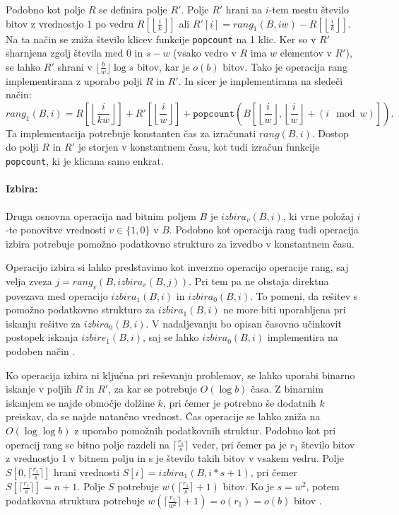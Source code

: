 Podobno kot polje $R$ se definira polje $R'$. Polje $R'$ hrani na $i$-tem mestu število bitov z vrednostjo $1$ po vedru $R[\left\lfloor\frac{i}{k} \right\rfloor]$ ali $R'[i]=rang_1(B,iw)-R[\left\lfloor\frac{i}{k} \right\rfloor]$. Na ta način se zniža število klicev funkcije \texttt{popcount} na 1 klic. Ker so v $R'$ sharnjena zgolj števila med 0 in $s-w$ (vsako vedro v $R$ ima $w$ elementov v $R'$), se lahko $R'$ shrani v $\lfloor\frac{b}{w}\rfloor\log{s}$ bitov, kar je $o(b)$ bitov. Tako je operacija rang implementirana z uporabo polji $R$ in $R'$. In sicer je implementirana na sledeči način:
\begin{equation*}
    rang_1(B,i)=R\left[\left\lfloor\frac{i}{kw} \right\rfloor\right]+ R'\left[\left\lfloor\frac{i}{w} \right\rfloor\right]+\texttt{popcount}\left(B\left[\left\lfloor\frac{i}{w} \right\rfloor,\left\lfloor\frac{i}{w} \right\rfloor+(i \mod w)\right]\right).
\end{equation*}
Ta implementacija potrebuje konstanten čas za izračunati $rang(B,i)$. Dostop do polji $R$ in $R'$ je storjen v konstantnem času, kot tudi izračun funkcije \texttt{popcount}, ki je klicana samo enkrat\cite{Navarro2016}.

\paragraph{Izbira:}
Druga osnovna operacija nad bitnim poljem $B$ je $izbira_v(B,i)$, ki vrne položaj $i$-te ponovitve vrednosti $v\in\{1,0\}$ v $B$. Podobno kot operacija rang tudi operacija izbira potrebuje pomožno podatkovno strukturo za izvedbo v konstantnem času. 

Operacijo izbira si lahko predstavimo kot inverzno operacijo operacije rang, saj velja zveza $j=rang_v(B,izbira_v(B,j))$. Pri tem pa ne obstaja direktna povezava med operacijo $izbira_1(B,i)$ in $izbira_0(B,i)$. To pomeni, da rešitev s pomožno podatkovno strukturo za $izbira_1(B,i)$ ne more biti uporabljena pri iskanju rešitve za $izbira_0(B,i)$. V nadaljevanju bo opisan časovno učinkovit postopek iskanja $izbire_1(B,i)$, saj se lahko $izbira_0(B,i)$ implementira na podoben način \cite{Navarro2016}.

Ko operacija izbira ni ključna pri reševanju problemov, se lahko uporabi binarno iskanje v poljih $R$ in $R'$, za kar se potrebuje $O(\log{b})$ časa. Z binarnim iskanjem se najde območje dolžine $k$, pri čemer je potrebno še dodatnih $k$ preiskav, da se najde natančno vrednost.
Čas operacije se lahko zniža na $O(\log\log b)$ z uporabo pomožnih podatkovnih struktur. Podobno kot pri operacij rang se bitno polje razdeli na $\lceil \frac{r_1}{s} \rceil$ veder, pri čemer pa je $r_1$ število bitov z vrednostjo 1 v bitnem polju in s je število takih bitov v vsakem vedru. Polje $S[0,\lceil \frac{r_1}{s} \rceil]$ hrani vrednosti $S[i]=izbira_1(B,i*s+1)$, pri čemer $S[\lceil \frac{r_1}{s} \rceil]=n+1$. Polje $S$ potrebuje $w(\lceil \frac{r_1}{s} \rceil +1)$ bitov. Ko je $s=w^2$, potem podatkovna struktura potrebuje $w(\lceil\frac{r_1}{w^2}\rceil+1)=o(r_1)=o(b)$ bitov \cite{Navarro2016}.

